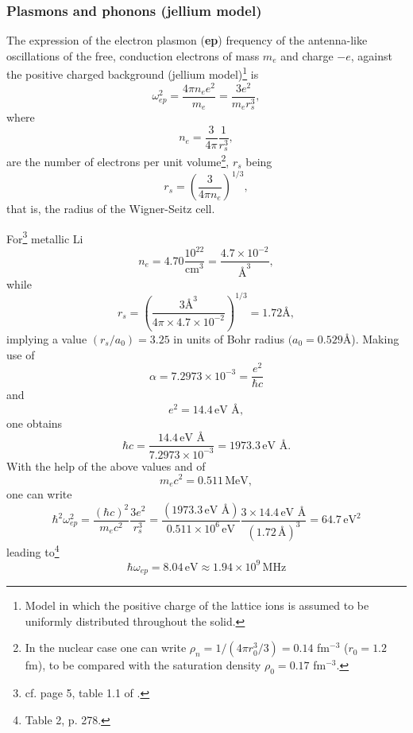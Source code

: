 \subsubsection{Plasmons and phonons (jellium model)}
The expression of the electron plasmon (\textbf{ep}) frequency of the antenna-like oscillations of the free, conduction electrons of mass $m_e$ and charge $-e$, against the positive charged background (jellium model)\footnote{Model in which the positive charge of the lattice ions is assumed to be uniformly distributed throughout the solid.} is
\begin{equation}\label{eq3.A.33}
\omega_{ep}^2=\frac{4\pi n_e e^2}{m_e}=\frac{3e^2}{m_er_s^3},
\end{equation}
where 
\begin{equation}
n_e=\frac{3}{4\pi}\frac{1}{r_s^3},
\end{equation}
are the number of electrons per unit volume\footnote{In the nuclear case one can write $\rho_n=1/(4\pi r_0^3/3)=0.14$ fm$^{-3}$ ($r_0=1.2$ fm), to be compared with the saturation density $\rho_0=0.17$ fm$^{-3}$.}, $r_s$ being
\begin{equation}
r_s=\left(\frac{3}{4\pi n_e}\right)^{1/3},
\end{equation}
that is, the radius of the Wigner-Seitz cell.


For\footnote{cf. page 5, table 1.1 of \cite{Ashcroft:87}.} metallic Li
\begin{equation}
n_e=4.70\frac{10^{22}}{\text{cm}^3}=\frac{4.7\times10^{-2}}{\text{\AA{}}^3},
\end{equation}
while
\begin{equation}
r_s=\left(\frac{3\text{\AA}^3}{4\pi\times4.7\times10^{-2}}\right)^{1/3}=1.72\text{\AA},
\end{equation}
implying a value $(r_s/a_0)=3.25$ in units of  Bohr radius $(a_0=0.529$\AA).
Making use of 
\begin{equation}
\alpha=7.2973\times10^{-3}=\frac{e^2}{\hbar c}
\end{equation}
and
\begin{equation}
e^2=14.4\,\text{eV \AA},
\end{equation}
one obtains
\begin{equation}
\hbar c=\frac{14.4\,\text{eV \AA}}{7.2973\times10^{-3}}=1973.3\,\text{eV \AA}.
\end{equation}
With the help of the above values and of
\begin{equation}
m_ec^2=0.511\,\text{MeV},
\end{equation}
one can write
\begin{equation}
\hbar^2\omega^2_{ep}=\frac{(\hbar c)^2}{m_e c^2}\frac{3e^2}{r_s^3}=\frac{(1973.3\,\text{eV \AA})}{0.511\times10^6\,\text{eV}}\frac{3\times14.4\,\text{eV \AA}}{(1.72\,\text{\AA})^3}=64.7\,\text{eV}^2
\end{equation}
leading to\footnote{\cite{Kittel:96} Table 2, p. 278.}
\begin{equation}
\hbar\omega_{ep}=8.04\,\text{eV}\approx 1.94\times 10^9\,\text{MHz}
\end{equation}


